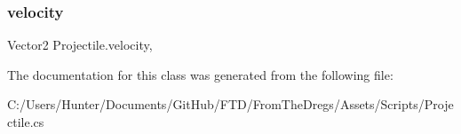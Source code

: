 \subsubsection{\texorpdfstring{velocity}{velocity}}
{\footnotesize\ttfamily Vector2 Projectile.\+velocity\hspace{0.3cm}{\ttfamily [get]}, {\ttfamily [set]}}



The documentation for this class was generated from the following file\+:\begin{DoxyCompactItemize}
\item 
C\+:/\+Users/\+Hunter/\+Documents/\+Git\+Hub/\+F\+T\+D/\+From\+The\+Dregs/\+Assets/\+Scripts/Projectile.\+cs\end{DoxyCompactItemize}
